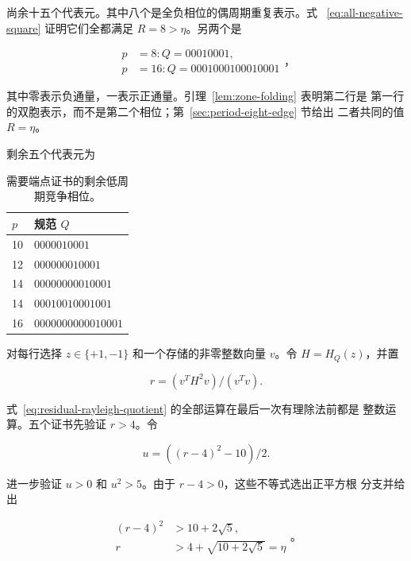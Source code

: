 尚余十五个代表元。其中八个是全负相位的偶周期重复表示。式~
\eqref{eq:all-negative-square} 证明它们全都满足 \(R=8>\eta\)。另两个是

\begin{equation}
\label{eq:target-zone-folding-rows}
\begin{aligned}
p&=8:  Q=00010001, \\
p&=16: Q=0001000100010001
\end{aligned}
\text{，}
\end{equation}

其中零表示负通量，一表示正通量。引理~\ref{lem:zone-folding} 表明第二行是
第一行的双胞表示，而不是第二个相位；第~\ref{sec:period-eight-edge} 节给出
二者共同的值 \(R=\eta\)。

剩余五个代表元为

\begin{table}[tbp]
\centering
\caption{需要端点证书的剩余低周期竞争相位。}
\label{tab:residual-competitors}
\begingroup
\renewcommand{\arraystretch}{1.12}
\begin{tabular}{ll}
\toprule
\(p\) & 规范 \(Q\) \\
\midrule
10 & \(0000010001\) \\
12 & \(000000010001\) \\
14 & \(00000000010001\) \\
14 & \(00010010001001\) \\
16 & \(0000000000010001\) \\
\bottomrule
\end{tabular}
\endgroup
\end{table}

对每行选择 \(z\in\{+1,-1\}\) 和一个存储的非零整数向量 \(v\)。令
\(H=H_Q(z)\)，并置

\begin{equation}
\label{eq:residual-rayleigh-quotient}
r=(v^T H^{2} v)/(v^T v).
\end{equation}

式~\eqref{eq:residual-rayleigh-quotient} 的全部运算在最后一次有理除法前都是
整数运算。五个证书先验证 \(r>4\)。令

\begin{equation}
u=((r-4)^{2}-10)/2.
\end{equation}

进一步验证 \(u>0\) 和 \(u^2>5\)。由于 \(r-4>0\)，这些不等式选出正平方根
分支并给出

\begin{equation}
\label{eq:residual-radical-comparison}
\begin{aligned}
(r-4)^{2}&>10+2\sqrt{5}, \\
r&>4+\sqrt{10+2\sqrt{5}}=\eta
\end{aligned}
\text{。}
\end{equation}

